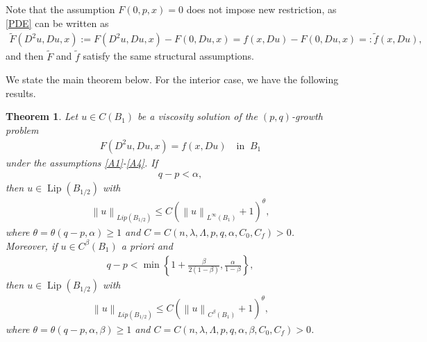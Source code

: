 \documentclass[reqno]{amsart}
\theoremstyle{plain}
\newtheorem{thm}{Theorem}[section]
\theoremstyle{definition}
\theoremstyle{remark}
\newcommand{\norm}[1]{\left\lVert#1\right\rVert}
\newcommand{\Lip}{\operatorname{Lip}}
\numberwithin{equation}{section}
\begin{document}
Note that the assumption $F(0,p,x)=0$ does not impose new restriction, as \eqref{PDE} can be written as 
\begin{align*}
    \tilde{F}(D^2u,Du,x):= F(D^2u,Du,x)-F(0,Du,x) =f(x,Du)-F(0,Du,x)=:\tilde{f}(x,Du),
\end{align*}
and then $\tilde{F}$ and $\tilde{f}$ satisfy the same structural assumptions.



We state the main theorem below.
For the interior case, we have the following results.
\begin{thm} \label{Main1}
    Let $u \in C(B_1)$ be a viscosity solution of the $(p,q)$-growth problem
    \begin{align*}
        F(D^2u,Du,x) = f(x,Du) \quad \text{in } \ B_1
    \end{align*}
    under the assumptions \ref{A1}-\ref{A4}. If
    \begin{align} \label{gapl}
        q-p< \alpha,
    \end{align}
    then $u \in \Lip(B_{1/2})$ with
    \begin{align*}
        \norm{u}_{Lip(B_{1/2})} \leq C(\norm{u}_{L^\infty(B_1)}+1)^\theta,
    \end{align*}
    where $\theta = \theta(q-p,\alpha)\geq1$ and $C=C(n,\lambda,\Lambda,p,q,\alpha,C_0,C_f)>0$.\\
    Moreover, if $u \in C^\beta(B_1)$ a priori and
    \begin{align} \label{gapbl}
       q-p< \min \left\{1 + \frac{\beta}{2(1-\beta)}, \frac{\alpha}{1-\beta} \right\},
    \end{align}
    then 
    $u \in \Lip(B_{1/2})$ with
    \begin{align*}
        \norm{u}_{Lip(B_{1/2})} \leq C(\norm{u}_{C^\beta(B_1)}+1)^\theta,
    \end{align*}
    where $\theta = \theta(q-p,\alpha,\beta)\geq1$ and  $C=C(n,\lambda,\Lambda,p,q,\alpha,\beta,C_0,C_f)>0$.
\end{thm}
\end{document}
